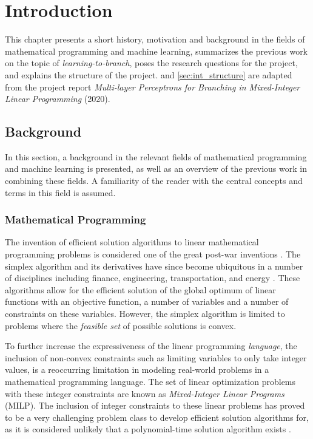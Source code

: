 \chapter{Introduction}\label{cha:introduction}
%
This chapter presents a short history, motivation and background in the fields of mathematical programming and machine learning, summarizes the previous work on the topic of \textit{learning-to-branch}, poses the research questions for the project, and explains the structure of the project.  and \ref{sec:int_structure} are adapted from the project report \textit{Multi-layer Perceptrons for Branching in Mixed-Integer Linear Programming} (2020). 


\section{Background}\label{sec:int_background}

In this section, a background in the relevant fields of mathematical programming and machine learning is presented, as well as an overview of the previous work in combining these fields. A familiarity of the reader with the central concepts and terms in this field is assumed.

\subsection{Mathematical Programming}

The invention of efficient solution algorithms to linear mathematical programming problems is considered one of the great post-war inventions \cite{dantzig1983reminiscences}. The simplex algorithm and its derivatives have since become ubiquitous in a number of disciplines including finance, engineering, transportation, and energy \cite{junger2010years}. These algorithms allow for the efficient solution of the global optimum of linear functions with an objective function, a number of variables and a number of constraints on these variables. However, the simplex algorithm is limited to problems where the \textit{feasible set} of possible solutions is convex.

To further increase the expressiveness of the linear programming \textit{language}, the inclusion of non-convex constraints such as limiting variables to only take integer values, is a reoccurring limitation in modeling real-world problems in a mathematical programming language. The set of linear optimization problems with these integer constraints are known as \textit{Mixed-Integer Linear Programs} (\gls{MILP}). The inclusion of integer constraints to these linear problems has proved to be a very challenging problem class to develop efficient solution algorithms for, as it is considered unlikely that a polynomial-time solution algorithm exists \cite{bengio2020machine}.

